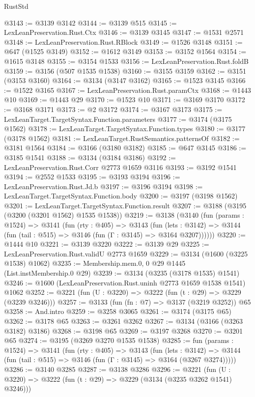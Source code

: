 \begin{lexlean}{RustStd}
\begin{coremodule}
@3143 := @3139 @3142
@3144 := @3139 @515
@3145 := LexLeanPreservation.Rust.Ctx
@3146 := @3139 @3145
@3147 := @1531 @2571
@3148 := LexLeanPreservation.Rust.RBlock
@3149 := @1526 @3148
@3151 := @647 (@1525 @3149)
@3152 := @1612 @3149
@3153 := @3152 @1564
@3154 := @1615 @3148
@3155 := @3154 @1533
@3156 := LexLeanPreservation.Rust.foldB
@3159 := @3156 (@507 @1535 @1538)
@3160 := @3155 @3159
@3162 := @3151 (@3153 @3160)
@3164 := @3134 (@3147 @3162)
@3165 := @1523 @3145
@3166 := @1522 @3165
@3167 := LexLeanPreservation.Rust.paramCtx
@3168 := @1443 @10
@3169 := @1443 @29
@3170 := @1523 @10
@3171 := @3169 @3170
@3172 := @3168 @3171
@3173 := @2 @3172
@3174 := @3167 @3173
@3175 := LexLeanTarget.TargetSyntax.Function.parameters
@3177 := @3174 (@3175 @1562)
@3178 := LexLeanTarget.TargetSyntax.Function.types
@3180 := @3177 (@3178 @1562)
@3181 := LexLeanTarget.RustSemantics.patternsOf
@3182 := @3181 @1564
@3184 := @3166 (@3180 @3182)
@3185 := @647 @3145
@3186 := @3185 @1541
@3188 := @3134 (@3184 @3186)
@3192 := LexLeanPreservation.Rust.Corr @2773 @1659 @3116
@3193 := @3192 @1541
@3194 := @2552 @1533
@3195 := @3193 @3194
@3196 := LexLeanPreservation.Rust.Jd.b
@3197 := @3196 @3194
@3198 := LexLeanTarget.TargetSyntax.Function.body
@3200 := @3197 (@3198 @1562)
@3201 := LexLeanTarget.TargetSyntax.Function.result
@3207 := @3188 (@3195 (@3200 (@3201 @1562) @1535 @1538))
@3219 := @3138
    (@3140
      (fun (params : @1524) =>
      @3141
        (fun (rty : @405) =>
        @3143
          (fun (lets : @3142) =>
          @3144 (fun (tail : @515) => @3146 (fun (Γ : @3145) => @3164 @3207))))))
@3220 := @1444 @10
@3221 := @3139 @3220
@3222 := @3139 @29
@3225 := LexLeanPreservation.Rust.validU @2773 @1659
@3229 := @3134 (@1600 (@3225 @1538) @1062)
@3235 := Membership.mem.{0, 0} @29 @1445 (List.instMembership.{0} @29)
@3239 := @3134 (@3235 (@3178 @1535) @1541)
@3246 := @1600 (LexLeanPreservation.Rust.uninh @2773 @1659 @1538 @1541) @1062
@3252 := @3221 (fun (U : @3220) => @3222 (fun (t : @29) => @3229 (@3239 @3246)))
@3257 := @3133 (fun (fn : @7) => @3137 (@3219 @3252)) @65
@3258 := And.intro
@3259 := @3258 @3065
@3261 := @3174 (@3175 @65)
@3262 := @3178 @65
@3263 := @3261 @3262
@3267 := @3134 (@3166 (@3263 @3182) @3186)
@3268 := @3198 @65
@3269 := @3197 @3268
@3270 := @3201 @65
@3274 := @3195 (@3269 @3270 @1535 @1538)
@3285 := fun (params : @1524) =>
  @3141
    (fun (rty : @405) =>
    @3143
      (fun (lets : @3142) =>
      @3144 (fun (tail : @515) => @3146 (fun (Γ : @3145) => @3164 (@3267 @3274)))))
@3286 := @3140 @3285
@3287 := @3138 @3286
@3296 := @3221 (fun (U : @3220) => @3222 (fun (t : @29) => @3229 (@3134 (@3235 @3262 @1541) @3246)))

\end{coremodule}
\end{lexlean}
